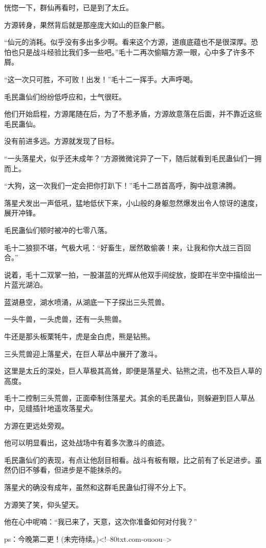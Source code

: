 \begin{this_body}
恍惚一下，群仙再看时，已是到了太丘。

方源转身，果然背后就是那座庞大如山的巨象尸骸。

“仙元的消耗。似乎没有多出多少啊。看来这个方源，道痕底蕴也不是很深厚。恐怕也只是战斗经验比我们多一些吧。”毛十二再次偷瞄方源一眼，心中多了许多不屑。

“这一次只可胜，不可败！出发！”毛十二一挥手。大声呼喝。

毛民蛊仙们纷纷低呼应和，士气很旺。

他们开始启程，方源尾随在后，为了不惹矛盾，方源故意落在后面，并不靠近这些毛民蛊仙。

没有前进多远。方源就发现了目标。

“一头落星犬，似乎还未成年？”方源微微诧异了一下，随后就看到毛民蛊仙们一拥而上。

“大狗，这一次我们一定会把你打趴下！”毛十二昂首高呼，胸中战意沸腾。

落星犬发出一声低吼，猛地低伏下来，小山般的身躯忽然爆发出令人惊讶的速度，展开冲锋。

毛民蛊仙们顿时被冲的七零八落。

毛十二狼狈不堪，气极大吼：“好畜生，居然敢偷袭！来，让我和你大战三百回合。”

说着，毛十二双掌一拍，一股湛蓝的光辉从他双手间绽放，旋即在半空中描绘出一片蓝光湖泊。

蓝湖悬空，湖水喷涌，从湖底一下子探出三头荒兽。

一头牛兽，一头虎兽，还有一头熊兽。

牛还是那头板栗牦牛，虎是金白虎，熊是钻熊。

三头荒兽迎上落星犬，在巨人草丛中展开了激斗。

这里是太丘的深处，巨人草极其高耸，即便是落星犬、钻熊之流，也不及巨人草的高度。

毛十二控制三头荒兽，正面牵制住落星犬。其余的毛民蛊仙，则躲避到巨人草丛中，见缝插针地遥攻落星犬。

方源在更远处旁观。

他可以明显看出，这处战场中有着多次激斗的痕迹。

毛民蛊仙们的表现，有点让他刮目相看。战斗有板有眼，比之前有了长足进步。虽然仍旧不够看，但进步是不能抹杀的。

落星犬的确没有成年，虽然和这群毛民蛊仙打得不分上下。

方源笑了笑，仰头望天。

他在心中呢喃：“我已来了，天意，这次你准备如何对付我？”

ps：今晚第二更！(未完待续。)<!--80txt.com-ouoou-->

\end{this_body}

